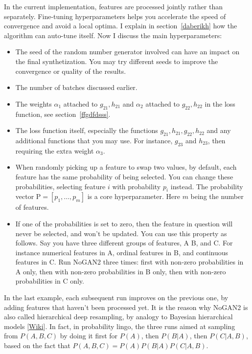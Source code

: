 \documentclass[oneside,10pt]{book}
\begin{document}
In the current implementation, features are processed jointly rather than separately. Fine-tuning \textcolor{index}{hyperparameters} helps you accelerate the speed of convergence and avoid a local optima. I explain in section~\ref{daberikh} how the algorithm can \textcolor{index}{auto-tune} itself. Now I discuss the main hyperparameters: \vspace{1ex}

\begin{itemize}
\item The \textcolor{index}{seed} of the random number generator involved can have an impact on the final synthetization. You may try different seeds to improve the convergence or quality of the results.
\item The number of \textcolor{index}{batches} discussed earlier.
\item The weights $\alpha_1$ attached to $g_{21}, h_{21}$ and  $\alpha_2$ attached to $g_{22}, h_{22}$ in the loss function, see section~\ref{ffgdfdsss}.
\item The \textcolor{index}{loss function} itself, especially the functions
 $g_{21}, h_{21}, g_{22}, h_{22}$ and any additional functions that you may use. For instance, $g_{23}$ and $h_{23}$, then requiring the extra weight $\alpha_3$.
\item When randomly picking up a feature to swap two values, by default, each feature has the same probability of being selected. You can change
 these probabilities, selecting feature $i$ with probability $p_i$ instead. The probability vector $\text{P}=[p_1,\dots, p_m]$ is a core hyperparameter.
 Here $m$ being the number of features.
\item If one of the probabilities is set to zero, then the feature in question will never be selected, and won't be updated. You can use
 this property as follows. Say you have three different groups of features, A B, and C.  For instance numerical features in A, ordinal features in B, and
continuous features in C. Run NoGAN2 three times: first with non-zero probabilities in A only, then with non-zero probabilities in B only, then
 with non-zero probabilities in C only.
\end{itemize}\vspace{1ex}

\noindent In the last example, each subsequent run improves on the previous one, by adding features that haven't been processed yet. It is the reason
 why NoGAN2 is also called \textcolor{index}{hierarchical deep resampling}, by analogy to
 \textcolor{index}{Bayesian hierarchical models} [\href{https://en.wikipedia.org/wiki/Bayesian_hierarchical_modeling}{Wiki}]. In fact, in probability lingo, the three runs aimed at sampling from $P(A, B, C)$ by doing it
 first for $P(A)$, then $P(B|A)$, then $P(C|A, B)$, based on the fact that
$P(A, B, C) = P(A) P(B|A) P(C | A, B)$.
\end{document}
